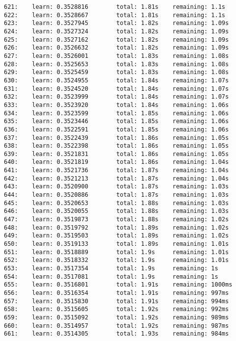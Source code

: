 \documentclass[11pt]{article}
\begin{document}
\begin{Verbatim}[commandchars=\\\{\}]
621:    learn: 0.3528816        total: 1.81s    remaining: 1.1s
622:    learn: 0.3528667        total: 1.81s    remaining: 1.1s
623:    learn: 0.3527945        total: 1.82s    remaining: 1.09s
624:    learn: 0.3527324        total: 1.82s    remaining: 1.09s
625:    learn: 0.3527162        total: 1.82s    remaining: 1.09s
626:    learn: 0.3526632        total: 1.82s    remaining: 1.09s
627:    learn: 0.3526001        total: 1.83s    remaining: 1.08s
628:    learn: 0.3525653        total: 1.83s    remaining: 1.08s
629:    learn: 0.3525459        total: 1.83s    remaining: 1.08s
630:    learn: 0.3524955        total: 1.84s    remaining: 1.07s
631:    learn: 0.3524520        total: 1.84s    remaining: 1.07s
632:    learn: 0.3523999        total: 1.84s    remaining: 1.07s
633:    learn: 0.3523920        total: 1.84s    remaining: 1.06s
634:    learn: 0.3523599        total: 1.85s    remaining: 1.06s
635:    learn: 0.3523446        total: 1.85s    remaining: 1.06s
636:    learn: 0.3522591        total: 1.85s    remaining: 1.06s
637:    learn: 0.3522439        total: 1.86s    remaining: 1.05s
638:    learn: 0.3522398        total: 1.86s    remaining: 1.05s
639:    learn: 0.3521831        total: 1.86s    remaining: 1.05s
640:    learn: 0.3521819        total: 1.86s    remaining: 1.04s
641:    learn: 0.3521736        total: 1.87s    remaining: 1.04s
642:    learn: 0.3521213        total: 1.87s    remaining: 1.04s
643:    learn: 0.3520900        total: 1.87s    remaining: 1.03s
644:    learn: 0.3520886        total: 1.87s    remaining: 1.03s
645:    learn: 0.3520653        total: 1.88s    remaining: 1.03s
646:    learn: 0.3520055        total: 1.88s    remaining: 1.03s
647:    learn: 0.3519873        total: 1.88s    remaining: 1.02s
648:    learn: 0.3519792        total: 1.89s    remaining: 1.02s
649:    learn: 0.3519503        total: 1.89s    remaining: 1.02s
650:    learn: 0.3519133        total: 1.89s    remaining: 1.01s
651:    learn: 0.3518889        total: 1.9s     remaining: 1.01s
652:    learn: 0.3518332        total: 1.9s     remaining: 1.01s
653:    learn: 0.3517354        total: 1.9s     remaining: 1s
654:    learn: 0.3517081        total: 1.9s     remaining: 1s
655:    learn: 0.3516801        total: 1.91s    remaining: 1000ms
656:    learn: 0.3516354        total: 1.91s    remaining: 997ms
657:    learn: 0.3515830        total: 1.91s    remaining: 994ms
658:    learn: 0.3515605        total: 1.92s    remaining: 992ms
659:    learn: 0.3515092        total: 1.92s    remaining: 989ms
660:    learn: 0.3514957        total: 1.92s    remaining: 987ms
661:    learn: 0.3514305        total: 1.93s    remaining: 984ms

\end{Verbatim}
\end{document}
